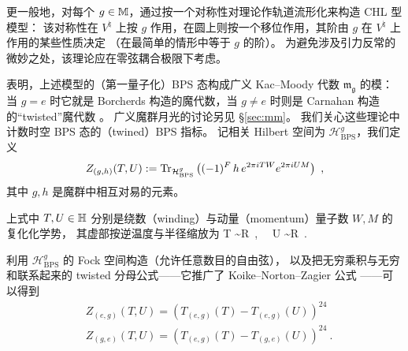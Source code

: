 
更一般地，对每个 $g\in\mathbb{M}$，通过按一个对称性对理论作轨道流形化来构造 CHL 型模型：
该对称性在 $V^\natural$ 上按 $g$ 作用，在圆上则按一个移位作用，其阶由 $g$ 在 $V^\natural$ 上作用的某些性质决定
（在最简单的情形中等于 $g$ 的阶）。
为避免涉及引力反常的微妙之处，该理论应在零弦耦合极限下考虑。


\cite{paquette2016monstrous} 表明，上述模型的（第一量子化）BPS 态构成广义 Kac–Moody 代数 $\mathfrak{m_g}$ 的模：
当 $g= e$ 时它就是 Borcherds 构造的魔代数，当 $g\neq e$ 时则是 Carnahan 构造的“twisted”魔代数
\cite{Carnahan2008,MR2904095,carnahan2012generalized}。
广义魔群月光的讨论另见 \S\ref{sec:mm}。
我们关心这些理论中计数时空 BPS 态的（twined）BPS 指标。
记相关 Hilbert 空间为 $\mathcal{H}^g_{\text{BPS}}$，我们定义
\begin{equation}
Z_{(g,h)}(T,U):=\operatorname{Tr}_{\mathcal{H}^g_{\text{BPS}}}\left((-1)^F \, h \, e^{2\pi iTW}e^{2\pi iUM}\right)~,
\end{equation}
其中 $g,h$ 是魔群中相互对易的元素。


上式中 $T,U\in \mathbb{H}$ 分别是绕数（winding）与动量（momentum）量子数 $W,M$ 的复化化学势，
其虚部按逆温度与半径缩放为
\be
\im T \sim {\beta R}~,~~ \im U \sim {\beta \over R}~.
\ee


利用 $\mathcal{H}^g_{\text{BPS}}$ 的 Fock 空间构造（允许任意数目的自由弦），
以及把无穷乘积与无穷和联系起来的 twisted 分母公式——它推广了 Koike–Norton–Zagier 公式 ——可以得到
\begin{equation}\label{BPSindexmonster}
\begin{split}
&Z_{(e,g)}(T,U)=\left(T_{(e,g)}(T)-T_{(e,g)}(U)\right)^{24} \\
&Z_{(g,e)}(T,U)=\left(T_{(e,g)}(T)-T_{(g,e)}(U)\right)^{24}~.
\end{split}
\end{equation}


